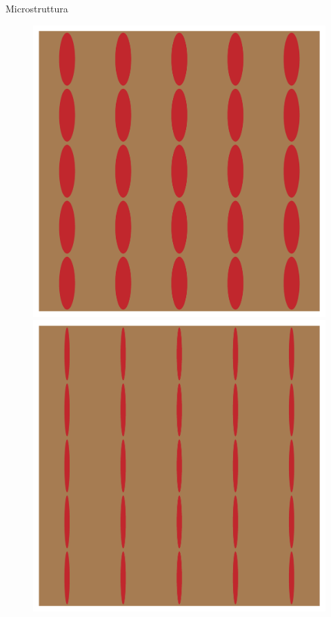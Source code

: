 \documentclass[aspectratio=169,xcolor=dvipsnames]{beamer}
\begin{document}
\begin{frame}{Microstruttura}
\begin{figure}
\begin{minipage}[b]{0.16\linewidth}
	\end{minipage}
	\begin{minipage}[b]{0.16\linewidth}
		\includegraphics[width=\linewidth]{test_mesh_axR_0.3.png}
	\end{minipage} 
	\begin{minipage}[b]{0.16\linewidth}
		\includegraphics[width=\linewidth]{test_mesh_axR_0.1.png}
	\end{minipage} 
\end{figure}


\end{frame}
\end{document}
